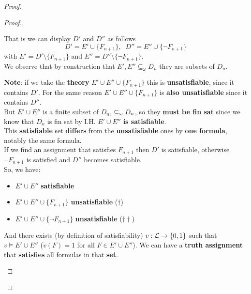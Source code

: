 \documentclass[11pt]{article}
\begin{document}
\begin{proof}
\begin{proof}
\begin{itemize}
				That is we can display $D'$ and $D''$ as follows 
				$$ D' = E' \cup \{F_{n+1}\}, \;\; D'' = E'' \cup \{\neg F_{n+1}\}$$
				with $E' = D' \setminus \{F_{n+1}\}$ and $E'' = D'' \setminus \{\neg F_{n+1}\}$.\\
				
				We observe that by construction that $E', E'' \subseteq_\omega D_n$ they are subsets of $D_n$.\\
				
				
				\newpage
				
				\textbf{Note}: if we take the \textbf{theory} $E' \cup E'' \cup \{F_{n+1}\}$ this is \textbf{unsatisfiable}, since it contains $D'$. For the same reason $E' \cup E'' \cup \{F_{n+1}\}$ is \textbf{also unsatisfiable} since it contains $D''$. \\
				
				But $E' \cup E''$ is a finite subset of $D_n$, $\subseteq_\omega D_n$, so they \textbf{must be fin sat} since we know that $D_n$ is fin sat by I.H. $E' \cup E''$ \textbf{is satisfiable}.\\
				
				This \textbf{satisfiable} set \textbf{differs} from the \textbf{unsatisfiable} ones by \textbf{one formula}, notably the same formula.\\
				
				If we find an assignment that satisfies $F_{n+1}$ then $D'$ is satisfiable, otherwise $\neg F_{n+1}$ is satisfied and $D''$ becomes satisfiable.\\
				
				So, we have: 
				\begin{itemize}
					\item $E' \cup E''$ \textbf{satisfiable}
					\item $E' \cup E'' \cup \{F_{n+1}\}$ \textbf{unsatisfiable} ($\dag$)
					\item $E' \cup E'' \cup \{\neg F_{n+1}\}$ \textbf{unsatisfiable} ($\dag \dag$)
				\end{itemize}
				
				And there exists (by definition of satisfiability) $v: \mathcal{L} \rightarrow \{0,1\}$ such that $v \models E' \cup E''$ ($\tilde{v}(F) =  1$ for all $F \in E' \cup E''$). We can have a \textbf{truth assignment} that \textbf{satisfies} all formulas in that \textbf{set}.\\
				

\end{itemize}
\end{proof}
\end{proof}
\end{document}
